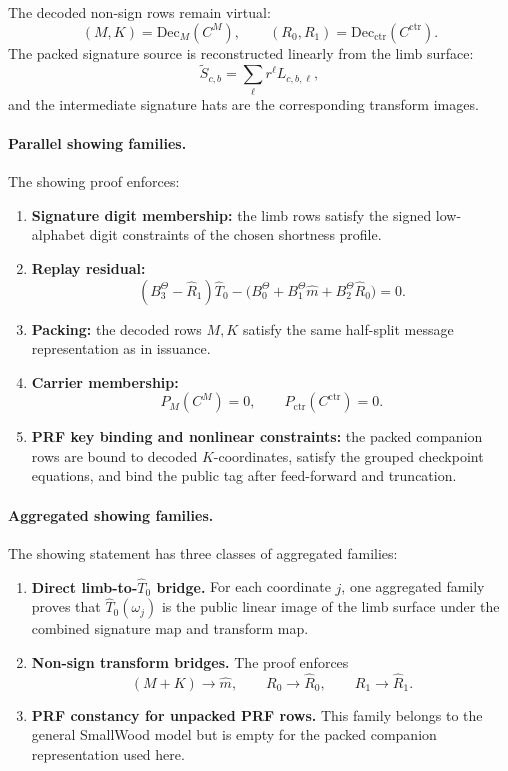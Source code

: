 The decoded non-sign rows remain virtual:
\[
  (M,K)=\mathrm{Dec}_M(C^M),\qquad
  (R_0,R_1)=\mathrm{Dec}_{\mathrm{ctr}}(C^{\mathrm{ctr}}).
\]
The packed signature source is reconstructed linearly from the limb surface:
\[
  \widetilde S_{c,b}=\sum_{\ell} r^\ell L_{c,b,\ell},
\]
and the intermediate signature hats are the corresponding transform images.

\paragraph{Parallel showing families.}
The showing proof enforces:
\begin{enumerate}[leftmargin=1.25em]
  \item \textbf{Signature digit membership:}
  the limb rows satisfy the signed low-alphabet digit constraints of the
  chosen shortness profile.
  \item \textbf{Replay residual:}
  \[
    (B_3^\Theta-\widehat R_1)\widehat T_0
    -\bigl(B_0^\Theta + B_1^\Theta\widehat m + B_2^\Theta\widehat R_0\bigr)=0.
  \]
  \item \textbf{Packing:}
  the decoded rows \(M,K\) satisfy the same half-split message
  representation as in issuance.
  \item \textbf{Carrier membership:}
  \[
    P_M(C^M)=0,\qquad P_{\mathrm{ctr}}(C^{\mathrm{ctr}})=0.
  \]
  \item \textbf{PRF key binding and nonlinear constraints:}
  the packed companion rows are bound to decoded \(K\)-coordinates, satisfy the
  grouped checkpoint equations, and bind the public tag after feed-forward and
  truncation.
\end{enumerate}

\paragraph{Aggregated showing families.}
The showing statement has three classes of aggregated families:
\begin{enumerate}[leftmargin=1.25em]
  \item \textbf{Direct limb-to-\(\widehat T_0\) bridge.}
  For each coordinate \(j\), one aggregated family proves that
  \(\widehat T_0(\omega_j)\) is the public linear image of the limb surface
  under the combined signature map and transform map.
  \item \textbf{Non-sign transform bridges.}
  The proof enforces
  \[
    (M+K)\rightarrow \widehat m,\qquad
    R_0\rightarrow \widehat R_0,\qquad
    R_1\rightarrow \widehat R_1.
  \]
  \item \textbf{PRF constancy for unpacked PRF rows.}
  This family belongs to the general SmallWood model but is empty for the
  packed companion representation used here.
\end{enumerate}

